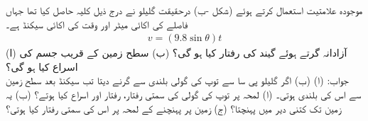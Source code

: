 موجودہ علامتیت استعمال کرتے ہوئے (شکل -ب)  درحقیقت گلیلو نے درج ذیل کلیہ حاصل کیا تھا جہاں فاصلے کی اکائی میٹر اور وقت کی اکائی سیکنڈ ہے۔
\begin{align*}
v=(9.8\sin \theta)t
\end{align*} 
(ا) آزادانہ گرتے ہوئے گیند کی رفتار کیا ہو گی؟ (ب) سطح زمین کے قریب جسم کی اسراع کیا ہو گی؟\\
جواب:\quad
(ا)  (ب) 
اگر گلیلو پی سا سے توپ کی گولی  بلندی سے گرنے دیتا تب  سیکنڈ بعد سطح زمین سے اس کی بلندی  ہوتی۔ (ا) لمحہ  پر توپ کی گولی کی سمتی رفتار، رفتار اور اسراع کیا ہوتے؟ (ب) یہ زمین تک کتنی دیر میں پہنچتا؟ (ج) زمین پر پہنچنے کے لمحہ پر اس کی سمتی رفتار کیا ہوتی؟ 

